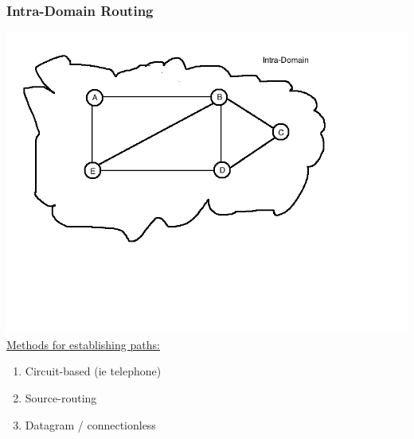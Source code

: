 \documentclass[11pt]{article}
\begin{document}
\subsubsection{Intra-Domain Routing}
\label{sec:orgheadline74}

\includegraphics[width=.9\linewidth]{diagrams/intradomainrouting.png}
\uline{Methods for establishing paths:}
\begin{enumerate}
\item Circuit-based (ie telephone)
\item Source-routing
\item Datagram / connectionless
\end{enumerate}
\end{document}
